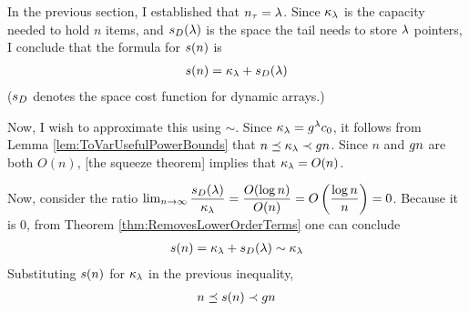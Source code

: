 In the previous section, I established that $n_\tau = \lambda$. Since $\kappa_\lambda$ is the capacity needed to hold $n$ items, and $s_D(\lambda)$ is the space the tail needs to store $\lambda$ pointers, I conclude that the formula for $s(n)$ is
\begin{align*}
s(n) = \kappa_\lambda + s_D(\lambda)
\end{align*}
($s_D$ denotes the space cost function for dynamic arrays.)


Now, I wish to approximate this using $\sim$. Since $\kappa_\lambda = g^\lambda c_0$, it follows from Lemma \ref{lem:ToVarUsefulPowerBounds} that $n \preceq \kappa_\lambda \prec g{n}$. Since $n$ and $g{n}$ are both $O(n)$, [the squeeze theorem] implies that $\kappa_\lambda = O(n)$.

Now, consider the ratio $\lim_{n \to \infty} \dfrac {s_D(\lambda)} {\kappa_\lambda} = \dfrac {O(\log n)} {O(n)} = O \left( \dfrac{\log n}{n} \right) = 0$. Because it is $0$, from Theorem \ref{thm:RemovesLowerOrderTerms} one can conclude
\begin{align*}
s(n) = \kappa_\lambda + s_D(\lambda) \sim \kappa_\lambda
\end{align*}
Substituting $s(n)$ for $\kappa_\lambda$ in the previous inequality,
\begin{align*}
n \preceq s(n) \prec g{n}
\end{align*}